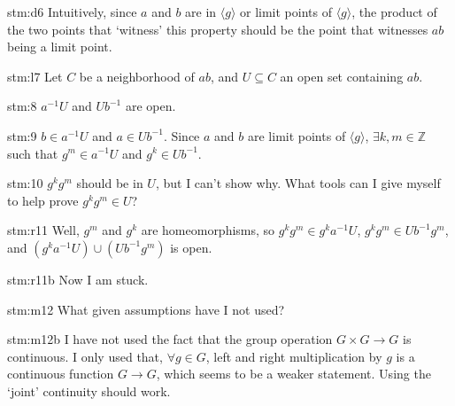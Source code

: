 \begin{explanation}{stm:d6}
Intuitively, since $a$ and $b$ are in ${\langle g \rangle}$ or limit points of ${\langle g \rangle}$, the product of the two points that ‘witness’ this property should be the point that witnesses $ab$ being a limit point.
\end{explanation}

\begin{explanation}{stm:l7}
Let $C$ be a neighborhood of $ab$, and $U \subseteq C$ an open set containing $ab$.
\end{explanation}

\begin{explanation}{stm:8}
$a^{-1}U$ and $Ub^{-1}$ are open.
\end{explanation}

\begin{explanation}{stm:9}
$b \in a^{-1}U$ and $a \in Ub^{-1}$. Since $a$ and $b$ are limit points of ${\langle g \rangle}$, $\exists k, m \in \mathbb{Z}$ such that $g^m \in a^{-1}U$ and $g^k \in Ub^{-1}$.
\end{explanation}

\begin{explanation}{stm:10}
$g^k g^m$ should be in $U$, but I can't show why. What tools can I give myself to help prove $g^k g^m \in U$?
\end{explanation}

\begin{explanation}{stm:r11}
Well, $g^m$ and $g^k$ are homeomorphisms, so $g^k g^m \in g^k a^{-1}U$, $g^k g^m \in Ub^{-1} g^m$, and $(g^k a^{-1}U) \cup (Ub^{-1} g^m)$ is open.
\end{explanation}

\begin{explanation}{stm:r11b}
Now I am stuck.
\end{explanation}

\begin{explanation}{stm:m12}
What given assumptions have I not used? 
\end{explanation}

\begin{explanation}{stm:m12b}
I have not used the fact that the group operation $G \times G \to G$ is continuous. I only used that, $\forall g \in G$, left and right multiplication by $g$ is a continuous function $G \to G$, which seems to be a weaker statement. Using the ‘joint’ continuity should work.
\end{explanation}

